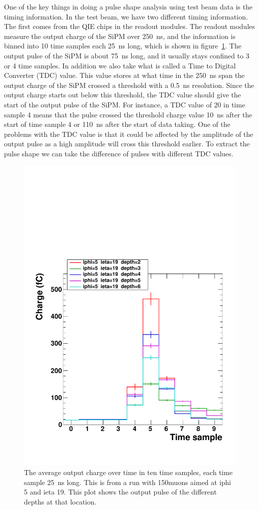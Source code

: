 One of the key things in doing a pulse shape analysis using test beam data is the timing information. In the test beam, we have two different timing information. The first comes from the QIE chips in the readout modules. The readout modules measure the output charge of the SiPM over 250~ns, and the information is binned into 10 time samples each 25~ns long, which is shown in figure~\ref{fig:PulSh}. The output pulse of the SiPM is about 75~ns long, and it usually stays confined to 3 or 4 time samples. In addition we also take what is called a Time to Digital Converter (TDC) value. This value stores at what time in the 250~ns span the output charge of the SiPM crossed a threshold with a 0.5~ns resolution. Since the output charge starts out below this threshold, the TDC value should give the start of the output pulse of the SiPM. For instance, a TDC value of 20 in time sample 4 means that the pulse crossed the threshold charge value 10~ns after the start of time sample 4 or 110~ns after the start of data taking. One of the problems with the TDC value is that it could be affected by the amplitude of the output pulse as a high amplitude will cross this threshold earlier. To extract the pulse shape we can take the difference of pulses with different TDC values. 

\begin{figure}
\centering
\includegraphics[width=0.6\linewidth]{Figures/Pulse.pdf}
\caption{The average output charge over time in ten time samples, each time sample 25~ns long. This is from a run with 150\GeV\space muons aimed at iphi 5 and ieta 19. This plot shows the output pulse of the different depths at that location.}
\label{fig:PulSh}
\end{figure}

